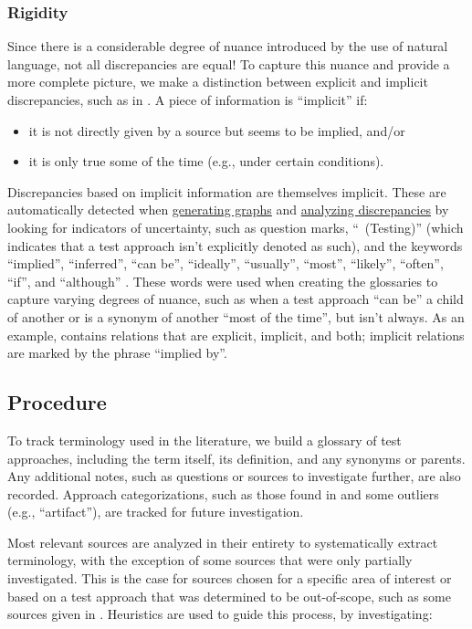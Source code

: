 \subsubsection{Rigidity}
\label{rigidity}

Since there is a considerable degree of nuance introduced by the use of natural
language, not all discrepancies are equal! To capture this nuance and provide a
more complete picture, we make a distinction between explicit and implicit
discrepancies, such as in . A piece of information is
``implicit'' if:
\begin{itemize}
    \item it is not directly given by a source but seems to be implied, and/or
    \item it is only true some of the time (e.g., under certain conditions).
\end{itemize}
Discrepancies based on implicit information are themselves implicit. These are
automatically detected when \hyperref[graph-gen]{generating graphs} and
\hyperref[discrep-analysis]{analyzing discrepancies} by looking for indicators
of uncertainty, such as question marks, ``~(Testing)'' (which indicates
that a test approach isn't explicitly denoted as such), and the keywords
``implied'', ``inferred'', ``can be'', ``ideally'', ``usually'', ``most'',
``likely'', ``often'', ``if'', and ``although''
. These words were used when creating
the glossaries to capture varying degrees of nuance, such as when a test
approach ``can be'' a child of another or is a synonym of another ``most of the
time'', but isn't always. As an example,  contains relations
that are explicit, implicit, and both; implicit relations are marked by the
phrase ``implied by''.

\subsection{Procedure}

To track terminology used in the literature, we build a glossary of test
approaches, including the term itself, its definition, and
any synonyms or parents. Any additional notes, such as questions or sources to investigate
further, are also recorded. Approach categorizations, such as those found in
 and some outliers (e.g., ``artifact''), are tracked
for future investigation.

Most relevant sources are analyzed in their entirety to systematically extract
terminology, with the exception of some sources that were only partially
investigated. This is the case for sources chosen for a specific area of
interest or based on a test approach that was determined to be out-of-scope,
such as some sources given in .
Heuristics are used to guide this process, by investigating:

